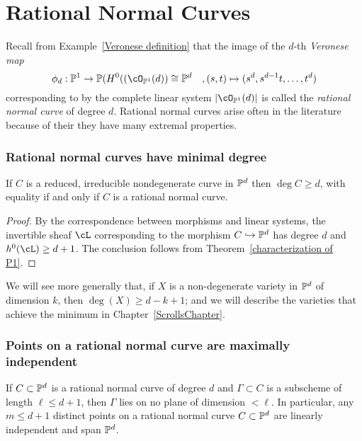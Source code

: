 \section{Rational Normal Curves}\label{rational normal curves section}

Recall from Example~\ref{Veronese definition} that the image of the $d$-th \emph{Veronese map}  
$$
\phi_d: \PP^1 \to \PP(H^0((\cO_{\PP^1}(d)) \cong \PP^d \quad, (s,t) \mapsto (s^d, s^{d-1}t, \dots, t^d)
$$
corresponding to by the complete linear system $|\cO_{\PP^1}(d)|$ is called the \emph{rational normal curve} of degree $d$. Rational normal curves arise often in the literature because of their they have many extremal properties. 

\subsubsection{Rational normal curves have minimal degree}

\begin{proposition}
If $C$ is a reduced, irreducible nondegenerate curve in $\PP^d$ then $\deg C \geq d$, with equality if and only if $C$ is a  rational normal curve.
\end{proposition}

\begin{proof}
By the correspondence between morphisms and linear systems, the invertible sheaf $\cL$ corresponding to the morphism $C \hookrightarrow \PP^d$ has degree $d$ and
 $h^0(\cL) \geq d+1$. The conclusion follows from Theorem~\ref{characterization of P1}.
\end{proof}

We will see more generally that, if $X$ is a non-degenerate variety in $\PP^d$ of dimension $k$, then $\deg(X) \geq d-k+1$; and we will describe the varieties that achieve the minimum in Chapter~\ref{ScrollsChapter}.

\subsubsection{Points on a rational normal curve are maximally independent}

\begin{proposition}\label{independence on rnc}
If $C\subset \PP^d$ is a rational normal curve of degree $d$ and $\Gamma\subset C$ is a subscheme of length $\ell \leq d+1$, then
$\Gamma$ lies on no plane of dimension $<\ell$. In particular, any $m \leq d+1$ distinct points on a rational normal curve $C \subset \PP^d$ are linearly independent
and span $\PP^d$.
\end{proposition}

